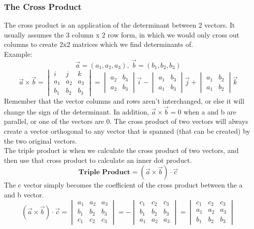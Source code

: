 \documentclass{article}
\begin{document}
          \subsubsection{The Cross Product}
          The cross product is an application of the determinant between 2 vectors.
          It usually assumes the 3 column x 2 row form, in which we would only cross out columns to create 2x2 matrices
          which we find determinants of.
          \\Example:
          $$ \vec{a} = (a_1, a_2, a_3),\  \vec{b} = (b_1,b_2,b_3)$$
          $$ \vec{a} \times \vec{b} = \begin{vmatrix}
            i & j & k \\
            a_1 & a_2 & a_3 \\
            b_1 & b_2 & b_3 
          \end{vmatrix} = \begin{vmatrix}
            a_2 & b_3 \\
            a_2 & b_3 
          \end{vmatrix} \vec{i} - \begin{vmatrix}
            a_1 & b_3 \\
            a_1 & b_3 
          \end{vmatrix} \vec{j} + \begin{vmatrix}
            a_1 & b_2 \\
            a_1 & b_2 
          \end{vmatrix}\vec{k}
          $$
          Remember that the vector columns and rows aren't interchanged, 
          or else it will change the sign of the determinant.
          In addition, $\vec{a} \times \vec{b} = 0$ when a and b are parallel, or one of the vectors are 0.
          The cross product of two vectors will always create a vector orthogonal to any vector
          that is spanned (that can be created) by the two original vectors.
          \\
          The triple product is when we calculate the cross product of two vectors, and then
          use that cross product to calculate an inner dot product.
          $$ \textbf{Triple Product} = (\vec{a} \times \vec{b}) \cdot \vec{c} $$
          The c vector simply becomes the coefficient of the cross product between the a and b vector.
          $$ (\vec{a} \times \vec{b})\cdot\vec{c} = \begin{vmatrix}
            a_1 & a_2 & a_3 \\
            b_1 & b_2 & b_3 \\
            c_1 & c_2 & c_3 
          \end{vmatrix} = -\begin{vmatrix}
            c_1 & c_2 & c_3 \\
            b_1 & b_2 & b_3 \\
            a_1 & a_2 & a_3 
          \end{vmatrix} = \begin{vmatrix}
            c_1 & c_2 & c_3 \\
            a_1 & a_2 & a_3 \\
            b_1 & b_2 & b_3 
          \end{vmatrix}
          $$
\end{document}
